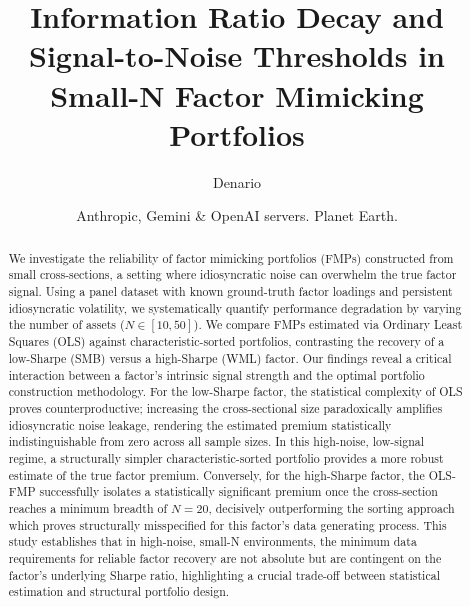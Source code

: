 \documentclass[]{article}
\begin{document}
\title{Information Ratio Decay and Signal-to-Noise Thresholds in Small-N Factor Mimicking Portfolios}

\author{Denario}
\date{Anthropic, Gemini \& OpenAI servers. Planet Earth.}

\maketitle
\begin{abstract}
We investigate the reliability of factor mimicking portfolios (FMPs) constructed from small cross-sections, a setting where idiosyncratic noise can overwhelm the true factor signal. Using a panel dataset with known ground-truth factor loadings and persistent idiosyncratic volatility, we systematically quantify performance degradation by varying the number of assets ($N \in [10, 50]$). We compare FMPs estimated via Ordinary Least Squares (OLS) against characteristic-sorted portfolios, contrasting the recovery of a low-Sharpe (SMB) versus a high-Sharpe (WML) factor. Our findings reveal a critical interaction between a factor's intrinsic signal strength and the optimal portfolio construction methodology. For the low-Sharpe factor, the statistical complexity of OLS proves counterproductive; increasing the cross-sectional size paradoxically amplifies idiosyncratic noise leakage, rendering the estimated premium statistically indistinguishable from zero across all sample sizes. In this high-noise, low-signal regime, a structurally simpler characteristic-sorted portfolio provides a more robust estimate of the true factor premium. Conversely, for the high-Sharpe factor, the OLS-FMP successfully isolates a statistically significant premium once the cross-section reaches a minimum breadth of $N=20$, decisively outperforming the sorting approach which proves structurally misspecified for this factor's data generating process. This study establishes that in high-noise, small-N environments, the minimum data requirements for reliable factor recovery are not absolute but are contingent on the factor's underlying Sharpe ratio, highlighting a crucial trade-off between statistical estimation and structural portfolio design.
\end{abstract}
\end{document}
